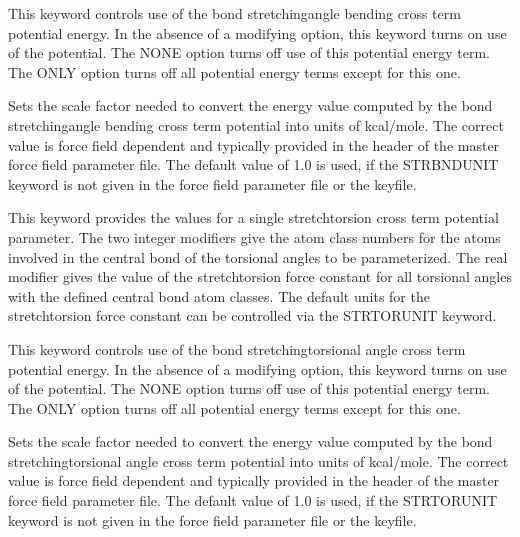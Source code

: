 \documentclass[letterpaper,11pt,english]{sphinxmanual}
\begin{document}
  This keyword controls use of the bond stretching\sphinxhyphen{}angle bending cross term potential energy. In the absence of a modifying option, this keyword turns on use of the potential. The NONE option turns off use of this potential energy term. The ONLY option turns off all potential energy terms except for this one.

  Sets the scale factor needed to convert the energy value computed by the bond stretching\sphinxhyphen{}angle bending cross term potential into units of kcal/mole. The correct value is force field dependent and typically provided in the header of the master force field parameter file. The default value of 1.0 is used, if the STRBNDUNIT keyword is not given in the force field parameter file or the keyfile.

  This keyword provides the values for a single stretch\sphinxhyphen{}torsion cross term potential parameter. The two integer modifiers give the atom class numbers for the atoms involved in the central bond of the torsional angles to be parameterized. The real modifier gives the value of the stretch\sphinxhyphen{}torsion force constant for all torsional angles with the defined central bond atom classes. The default units for the stretch\sphinxhyphen{}torsion force constant can be controlled via the STRTORUNIT keyword.

  This keyword controls use of the bond stretching\sphinxhyphen{}torsional angle cross term potential energy. In the absence of a modifying option, this keyword turns on use of the potential. The NONE option turns off use of this potential energy term. The ONLY option turns off all potential energy terms except for this one.

  Sets the scale factor needed to convert the energy value computed by the bond stretching\sphinxhyphen{}torsional angle cross term potential into units of kcal/mole. The correct value is force field dependent and typically provided in the header of the master force field parameter file. The default value of 1.0 is used, if the STRTORUNIT keyword is not given in the force field parameter file or the keyfile.


\end{document}
